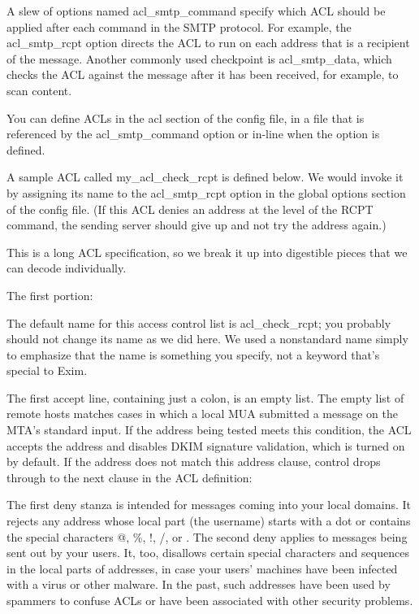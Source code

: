 A slew of options named {acl\_smtp\_}{command} specify which ACL should
be applied after each {command} in the SMTP protocol. For example, the
{acl\_smtp\_rcpt} option directs the ACL to run on each address that is
a recipient of the message. Another commonly used checkpoint is
{acl\_smtp\_data}, which checks the ACL against the message after it has
been received, for example, to scan content.

You can define ACLs in the {acl} section of the config file, in a file
that is referenced by the {acl\_smtp\_}{command} option or in-line when
the option is defined.

A sample ACL called {my\_acl\_check\_rcpt} is defined below. We would
invoke it by assigning its name to the {acl\_smtp\_rcpt} option in the
global options section of the config file. (If this ACL denies an
address at the level of the RCPT command, the sending server should give
up and not try the address again.)

This is a long ACL specification, so we break it up into digestible
pieces that we can decode individually.

The first portion:


The default name for this access control list is {acl\_check\_rcpt}; you
probably should not change its name as we did here. We used a
nonstandard name simply to emphasize that the name is something you
specify, not a keyword that's special to Exim.

The first {accept} line, containing just a colon, is an empty list. The
empty list of remote hosts matches cases in which a local MUA submitted
a message on the MTA's standard input. If the address being tested meets
this condition, the ACL accepts the address and disables DKIM signature
validation, which is turned on by default. If the address does not match
this {address} clause, control drops through to the next clause in the
ACL definition:


The first {deny} stanza is intended for messages coming into your local
domains. It rejects any address whose local part (the username) starts
with a dot or contains the special characters {@}, {\%}, {!}, {/}, or
{\textbar{}}. The second {deny} applies to messages being sent out by
your users. It, too, disallows certain special characters and sequences
in the local parts of addresses, in case your users' machines have been
infected with
\protect\hypertarget{part0026_split_047.htmlux5cux23_idIndexMarker2649}{}{}\protect\hypertarget{part0026_split_047.htmlux5cux23_idIndexMarker2650}{}{}a
virus or other malware. In the past, such addresses have been used by
spammers to confuse ACLs or have been associated with other security
problems.

